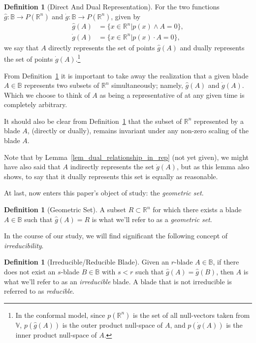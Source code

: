 \documentclass{birkjour}
\theoremstyle{definition}
\newtheorem{defn}[thm]{Definition}
\theoremstyle{remark}
\numberwithin{equation}{section}
\newcommand{\R}{\mathbb{R}}
\newcommand{\B}{\mathbb{B}}
\newcommand{\V}{\mathbb{V}}
\newcommand{\gd}{\dot{g}}
\newcommand{\gh}{\hat{g}}
\begin{document}
\begin{defn}[Direct And Dual Representation]\label{def_gh_and_gd}
For the two functions $\gh:\B\to P(\R^n)$ and $\gd:\B\to P(\R^n)$, given by
\begin{align}
\gh(A) &= \{x\in\R^n|p(x)\wedge A=0\},\\
\gd(A) &= \{x\in\R^n|p(x)\cdot A=0\},
\end{align}
we say that $A$ directly represents the set of points $\gh(A)$ and
dually represents the set of points $\gd(A)$.\footnote{In the conformal model, since
$p(\R^n)$ is the set of all null-vectors taken from $\V$, $p(\gh(A))$ is the outer product
null-space of $A$, and $p(\gd(A))$ is the inner product null-space of $A$.}
\end{defn}

From Definition~\ref{def_gh_and_gd} it is important to take away the realization that a given blade $A\in\B$
represents two subsets of $\R^n$ simultaneously; namely, $\gh(A)$ and $\gd(A)$.  Which we choose
to think of $A$ as being a representative of at any given time is completely arbitrary.

It should also be clear from Definition~\ref{def_gh_and_gd} that the subset of $\R^n$ represented by a
blade $A$, (directly or dually), remains invariant under any non-zero scaling of the blade $A$.

Note that by Lemma~\ref{lem_dual_relationship_in_rep} (not yet given), we might
have also said that $A$ indirectly represents the
set $\gd(A)$, but as this lemma also shows, to say that it dually represents this set is equally
as reasonable.

At last, now enters this paper's object of study: the {\it geometric set}.

\begin{defn}[Geometric Set]\label{def_geo_set}
A subset $R\subset\R^n$ for which there exists a blade $A\in\B$ such that $\gh(A)=R$ is what
we'll refer to as a {\it geometric set}.
\end{defn}

In the course of our study, we will find significant the following concept of {\it irreducibility}.

\begin{defn}[Irreducible/Reducible Blade]\label{def_irreducible_blade}
Given an $r$-blade $A\in\B$, if there does not exist an $s$-blade $B\in\B$ with $s<r$
such that $\gh(A)=\gh(B)$, then $A$ is what we'll refer to as an {\it irreducible} blade.
A blade that is not irreducible is referred to as {\it reducible}.
\end{defn}
\end{document}
